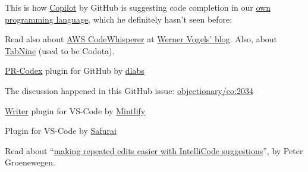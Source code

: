 \documentclass{article}
\begin{document}

This is how \href{https://github.com/features/copilot}{Copilot} by GitHub is suggesting code completion in our \href{https://www.eolang.org}{own programming language}, which he definitely hasn't seen before:

\begin{multicols}{4}
\end{multicols}

Read also about \href{https://aws.amazon.com/codewhisperer/}{AWS CodeWhisperer} at \href{https://www.allthingsdistributed.com/2023/04/how-ai-coding-companions-will-change-the-way-developers-work.html}{Werner Vogels' blog}. Also, about \href{https://github.com/codota}{TabNine} (used to be Codota).

\plush{}



\href{https://github.com/decentralizedlabs/pr-codex}{PR-Codex} plugin for GitHub by \href{https://www.dlabs.app/}{dlabs}

\plush{}



The discussion happened in this GitHub issue: \href{https://github.com/objectionary/eo/pull/2034}{objectionary/eo:2034}

\plush{}



\plush{}



\href{https://github.com/mintlify/writer}{Writer} plugin for VS-Code by \href{https://writer.mintlify.com/}{Mintlify}

\plush{}



Plugin for VS-Code by \href{https://www.safurai.com/}{Safurai}

\plush{}


Read about ``\href{https://devblogs.microsoft.com/visualstudio/making-repeated-edits-easier-with-intellicode-suggestions/}{making repeated edits easier with IntelliCode suggestions}'', by Peter Groenewegen.
\end{document}
